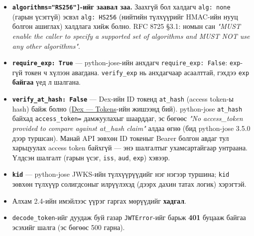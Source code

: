 \begin{Shaded}
\begin{Highlighting}[]
\NormalTok{) }\OperatorTok{{-}\textgreater{}}
    \NormalTok{:}
\OperatorTok{=}\OperatorTok{**}
\OperatorTok{=}\OperatorTok{=}\NormalTok{), }\OperatorTok{**}
\OperatorTok{=}\NormalTok{) }\NormalTok{) }\NormalTok{ [}\NormalTok{]}
\end{Highlighting}
\end{Shaded}

\begin{itemize}
\tightlist
\item
  \textbf{\texttt{algorithms=\allowbreak{}{[}"RS256"{]}}-ийг заавал заа.} Заахгүй бол халдагч \texttt{alg:\ none} (гарын үсэггүй) эсвэл \texttt{alg:\ HS256} (нийтийн түлхүүрийг HMAC-ийн нууц болгон ашиглах) халдлага хийж болно. RFC 8725 §3.1: номын сан \emph{"MUST enable the caller to specify a supported set of algorithms and MUST NOT use any other algorithms"}.
\item
  \textbf{\texttt{require\_\allowbreak{}exp:\allowbreak{}\ True}} --- python-jose-ийн анхдагч \texttt{require\_\allowbreak{}exp:\allowbreak{}\ False}: \texttt{exp}-гүй токен ч хүлээн авагдана. \texttt{verify\_exp} нь анхдагчаар асаалттай, гэхдээ \texttt{exp} \textbf{байгаа} үед л шалгана.
\item
  \textbf{\texttt{verify\_\allowbreak{}at\_\allowbreak{}hash:\allowbreak{}\ False}} --- Dex-ийн ID токенд \texttt{at\_hash} (access token-ы hash) байж болно (\href{https://dexidp.io/docs/configuration/tokens/}{Dex --- Tokens}-ийн жишээнд бий). python-jose \texttt{at\_hash} байхад \texttt{access\_token=} дамжуулахыг шаарддаг, эс бөгөөс \emph{"No access\_token provided to compare against at\_hash claim"} алдаа өгнө (бид python-jose 3.5.0 дээр туршсан). Манай API зөвхөн ID токеныг Bearer болгон авдаг тул харьцуулах access token байхгүй --- энэ шалгалтыг ухамсартайгаар унтраана. Үлдсэн шалгалт (гарын үсэг, \texttt{iss}, \texttt{aud}, \texttt{exp}) хэвээр.
\item
  \textbf{\texttt{kid}} --- python-jose JWKS-ийн түлхүүрүүдийг нэг нэгээр туршина; \texttt{kid} зөвхөн түлхүүр солигдсоныг илрүүлэхэд (дээрх дахин татах логик) хэрэгтэй.
\item
  Алхам 2.4-ийн имэйлээс үүрэг гаргах мөрүүдийг \textbf{хадгал}.
\item
  \texttt{decode\_token}-ийг дуудаж буй газар \texttt{JWTError}-ийг барьж \textbf{401} буцааж байгаа эсэхийг шалга (эс бөгөөс 500 гарна).
\end{itemize}

